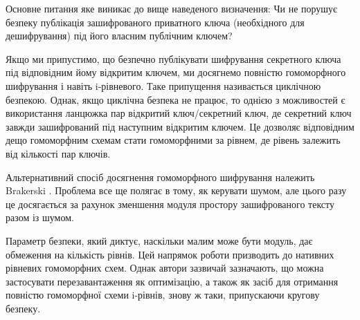 Основне питання яке виникає до вище наведеного визначення: Чи не порушує безпеку публікація
зашифрованого приватного ключа (необхідного для дешифрування) під його власним публічним
ключем?

Якщо ми припустимо, що безпечно публікувати шифрування секретного ключа під відповідним
йому відкритим ключем, ми досягнемо повністю гомоморфного шифрування і навіть i-рівневого.
Таке припущення називається циклічною безпекою. Однак, якщо циклічна безпека не працює,
то однією з можливостей є використання ланцюжка пар відкритий ключ/секретний ключ, де
секретний ключ завжди зашифрований під наступним відкритим ключем. Це дозволяє відповідним
дещо гомоморфним схемам стати гомоморфними за рівнем, де рівень залежить від кількості пар
ключів.

Альтернативний спосіб досягнення гомоморфного шифрування належить Brakerski
\cite{cryptoeprint:2011/344}. Проблема все ще полягає в тому, як керувати шумом, але цього
разу це досягається за рахунок зменшення модуля простору зашифрованого тексту разом із
шумом.

Параметр безпеки, який диктує, наскільки малим може бути модуль, дає обмеження на кількість
рівнів. Цей напрямок роботи призводить до нативних рівневих гомоморфних схем. Однак автори
зазвичай зазначають, що можна застосувати перезавантаження як оптимізацію, а також як засіб
для отримання повністю гомоморфної схеми i-рівнів, знову ж таки, припускаючи кругову
безпеку.
